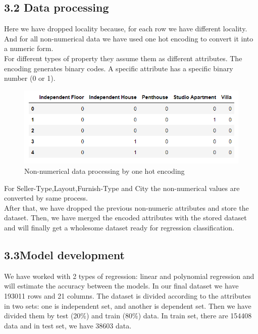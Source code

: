 \documentclass[conference]{IEEEtran}[10]
\begin{document}
\subsection{3.2 Data processing}
Here we have dropped locality because, for each row we have different locality. And for all non-numerical data we have used one hot encoding to convert it into a numeric form.\\
For different types of property they assume them as different attributes. The encoding generates binary codes. A specific attribute has a specific binary number (0 or 1). 
\begin{figure}[H]
\centering
\includegraphics[scale=0.4]{one hot encoding}
\caption{ Non-numerical data processing by one hot encoding}
\end{figure}
For Seller-Type,Layout,Furnish-Type and City the non-numerical values are converted by same process.\\
After that, we have dropped the previous non-numeric attributes and store the dataset. Then, we have merged the encoded attributes with the stored dataset and will finally get a wholesome dataset ready for regression classification.
\subsection{3.3Model development}
We have worked with 2 types of regression: linear and polynomial regression and will estimate the accuracy between the models. In our final dataset we have 193011 rows and 21 columns. The dataset is divided according to the attributes in two sets: one is independent set, and another is dependent set. Then we have divided them by test (20\%) and train (80\%) data. In train set, there are 154408 data and in test set, we have 38603 data.
\end{document}
